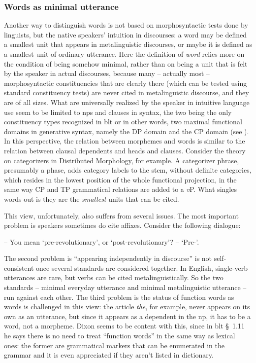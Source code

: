 \documentclass[UTF8, a4paper, oneside, scheme=plain]{ctexart}
\newcommand*{\citesec}[1]{\S~{#1}}
\newcommand*{\term}[1]{\emph{#1}}
\newcommand*{\corpus}[1]{\emph{#1}}
\newcommand*{\vP}{\textit{v}P}
\def\\{}%
\begin{document}
\subsubsection{Words as minimal utterance}\label{sec:word-minimal-utterance}

Another way to distinguish words is not based on morphosyntactic tests done by linguists,
but the native speakers' intuition in discourses:
a word may be defined a smallest unit that appears in metalinguistic discourses,
or maybe it is defined as a smallest unit of ordinary utterance.
Here the definition of \term{word} relies more on the condition of being somehow minimal,
rather than on being a unit that is felt by the speaker in actual discourses,
because many -- actually most -- morphosyntactic constituencies that are clearly there 
(which can be tested using standard constituency tests)
are never cited in metalinguistic discourse,
and they are of all sizes.
What are universally realized by the speaker in intuitive language use 
seem to be limited to \ac{np}s and clauses in syntax,
the two being the only constituency types recognized in \ac{blt}
or in other words, two maximal functional domains in generative syntax,
namely the DP domain and the CP domain (see ).
In this perspective, the relation between morphemes and words 
is similar to the relation between clausal dependents and heads and clauses.
Consider the theory on categorizers in Distributed Morphology, for example.
A categorizer phrase,
presumably a phase, 
adds category labels to the stem,
without definite categories, which resides in the lowest position of the whole functional projection,
in the same way CP and TP grammatical relations are added to a \vP.
What singles words out is they are the \emph{smallest} units that can be cited.

This view, unfortunately, also suffers from several issues.
The most important problem is speakers sometimes do cite affixes.
Consider the following dialogue:
\begin{exe}
    \ex\label{ex:affix-real} -- You mean `pre-revolutionary', or `post-revolutionary'? \\
    -- `Pre-'.
\end{exe}
The second problem is ``appearing independently in discourse''
is not self-consistent
once several standards are considered together.
In English, single-verb utterances are rare,
but verbs can be cited metalinguistically.
So the two standards -- minimal everyday utterance and minimal metalinguistic utterance -- 
run against each other.
The third problem is the status of function words as words is challenged in this view:
the article \corpus{the}, 
for example, never appears on its own as an utterance,
but since it appears as a dependent in the \ac{np},
it has to be a word, not a morpheme.
Dixon seems to be content with this,
since in \ac{blt} \citesec{1.11} he says there is no need to treat 
``function words'' in the same way as lexical ones:
the former are grammatical markers that can be enumerated in the grammar
and it is even appreciated if they aren't listed in dictionary.
\end{document}
